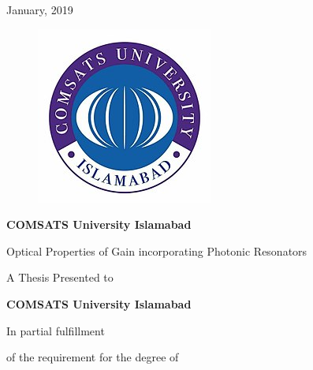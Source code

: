 \documentclass[12pt,twoside]{report}
\begin{document}
	\begin{center}
		 January, 2019
	\end{center}
	\newpage
	\noindent
	\begin{figure}
		\centering
		\includegraphics[width=0.8\linewidth]{university.jpg}
	\end{figure}
	\begin{center}
	{\Large{ \textbf{COMSATS University Islamabad}}}
	\end{center}
	
	\vspace{0.2 in}
	
	\begin{center}
		{\Large {Optical Properties of Gain incorporating Photonic Resonators
		} }
	\end{center}
	\vspace{0.5 in}
	
	\begin{center}
	{A Thesis Presented to}
	\end{center}
	\vspace{0.2 in}
	\begin{center}
		{\Large {\textbf{COMSATS University Islamabad}} }
	\end{center}
	\vspace{0.5 in}
	\begin{center}
		{In partial fulfillment }
	\end{center}

	\begin{center}
		{of the requirement for the degree of}
	\end{center}
	
\end{document}
